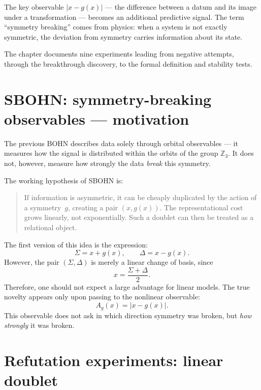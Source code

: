 \documentclass[11pt,a4paper]{report}
\begin{document}
The key observable $|x - g(x)|$ --- the difference between a datum and its image under a transformation --- becomes an additional predictive signal. The term ``symmetry breaking'' comes from physics: when a system is not exactly symmetric, the deviation from symmetry carries information about its state.

The chapter documents nine experiments leading from negative attempts, through the breakthrough discovery, to the formal definition and stability tests.


\section{SBOHN: symmetry-breaking observables --- motivation}

The previous BOHN describes data solely through orbital observables --- it measures
how the signal is distributed within the orbits of the group $\mathbb{Z}_3$. It does not, however, measure
how strongly the data \emph{break} this symmetry.

The working hypothesis of SBOHN is:

\begin{quote}
If information is asymmetric, it can be cheaply duplicated by the action of a
symmetry~$g$, creating a pair $(x,g(x))$. The representational cost grows linearly,
not exponentially. Such a doublet can then be treated as a relational object.
\end{quote}

The first version of this idea is the expression:
\[
\Sigma=x+g(x),\qquad \Delta=x-g(x).
\]
However, the pair $(\Sigma,\Delta)$ is merely a linear change of basis, since
\[
x=\frac{\Sigma+\Delta}{2}.
\]
Therefore, one should not expect a large advantage for linear models.
The true novelty appears only upon passing to the nonlinear observable:
\[
A_g(x)=|x-g(x)|.
\]
This observable does not ask in which direction symmetry was broken, but \emph{how strongly}
it was broken.


\section{Refutation experiments: linear doublet}
\end{document}
